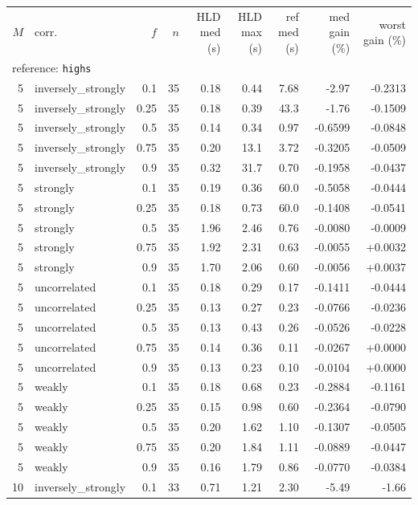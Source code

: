 \begin{tabular}{rlrrrrrrr}
\hline
$M$ & corr. & $f$ & $n$ & HLD med (s) & HLD max (s) & ref med (s) & med gain (\%) & worst gain (\%) \\
\multicolumn{9}{l}{reference: \texttt{highs}} \\
\hline
5 & inversely\_strongly & 0.1 & 35 & 0.18 & 0.44 & 7.68 & -2.97 & -0.2313 \\
5 & inversely\_strongly & 0.25 & 35 & 0.18 & 0.39 & 43.3 & -1.76 & -0.1509 \\
5 & inversely\_strongly & 0.5 & 35 & 0.14 & 0.34 & 0.97 & -0.6599 & -0.0848 \\
5 & inversely\_strongly & 0.75 & 35 & 0.20 & 13.1 & 3.72 & -0.3205 & -0.0509 \\
5 & inversely\_strongly & 0.9 & 35 & 0.32 & 31.7 & 0.70 & -0.1958 & -0.0437 \\
5 & strongly & 0.1 & 35 & 0.19 & 0.36 & 60.0 & -0.5058 & -0.0444 \\
5 & strongly & 0.25 & 35 & 0.18 & 0.73 & 60.0 & -0.1408 & -0.0541 \\
5 & strongly & 0.5 & 35 & 1.96 & 2.46 & 0.76 & -0.0080 & -0.0009 \\
5 & strongly & 0.75 & 35 & 1.92 & 2.31 & 0.63 & -0.0055 & +0.0032 \\
5 & strongly & 0.9 & 35 & 1.70 & 2.06 & 0.60 & -0.0056 & +0.0037 \\
5 & uncorrelated & 0.1 & 35 & 0.18 & 0.29 & 0.17 & -0.1411 & -0.0444 \\
5 & uncorrelated & 0.25 & 35 & 0.13 & 0.27 & 0.23 & -0.0766 & -0.0236 \\
5 & uncorrelated & 0.5 & 35 & 0.13 & 0.43 & 0.26 & -0.0526 & -0.0228 \\
5 & uncorrelated & 0.75 & 35 & 0.14 & 0.36 & 0.11 & -0.0267 & +0.0000 \\
5 & uncorrelated & 0.9 & 35 & 0.13 & 0.23 & 0.10 & -0.0104 & +0.0000 \\
5 & weakly & 0.1 & 35 & 0.18 & 0.68 & 0.23 & -0.2884 & -0.1161 \\
5 & weakly & 0.25 & 35 & 0.15 & 0.98 & 0.60 & -0.2364 & -0.0790 \\
5 & weakly & 0.5 & 35 & 0.20 & 1.62 & 1.10 & -0.1307 & -0.0505 \\
5 & weakly & 0.75 & 35 & 0.20 & 1.84 & 1.11 & -0.0889 & -0.0447 \\
5 & weakly & 0.9 & 35 & 0.16 & 1.79 & 0.86 & -0.0770 & -0.0384 \\
10 & inversely\_strongly & 0.1 & 33 & 0.71 & 1.21 & 2.30 & -5.49 & -1.66 \\

\end{tabular}
